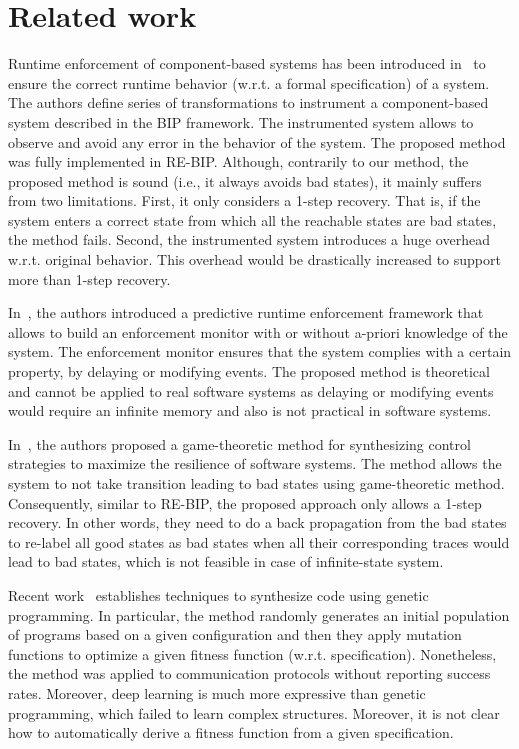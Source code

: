 \section{Related work}
\label{sec:rw}
Runtime enforcement of component-based systems has been introduced in~\cite{CharafeddineEFJ15} to ensure the correct runtime behavior (w.r.t. a formal specification) of a system. 
The authors define series of transformations to instrument a component-based system described in the BIP framework. The instrumented system allows to observe and avoid any error in the behavior of the system. 
The proposed method was fully implemented in RE-BIP. 
Although, contrarily to our method, the proposed method is sound (i.e., it always avoids bad states), it mainly suffers from two limitations. First, it only considers a 1-step recovery. That is, if the system enters a correct state from which all the reachable states are bad states, the method fails.  Second, the instrumented system introduces a huge overhead w.r.t. original behavior. This overhead would be drastically increased to support more than 1-step recovery. 

In~\cite{PinisettyPTJFM16,PinisettyT16}, the authors introduced a predictive runtime enforcement framework that allows to build an enforcement monitor with or without a-priori knowledge of the system. 
The enforcement monitor ensures that the system complies with a certain property, by delaying or modifying events. The proposed method is theoretical and cannot be applied to real software systems as delaying or modifying events would require an infinite memory and also is not practical in software systems. 

In~\cite{HuangPSW16}, the authors proposed a game-theoretic method for synthesizing control strategies to maximize the resilience of software systems. The method allows the system to not take transition leading to bad states using game-theoretic method. Consequently,  similar to RE-BIP, the proposed approach only allows a 1-step recovery. In other words, they need to do a back propagation from the bad states to re-label all good states as bad states when all their corresponding traces would lead to bad states, which is not feasible in case of infinite-state system. 


Recent work~\cite{genetic1,genetic2,genetic3} establishes techniques to synthesize code using genetic programming.  In particular, the method randomly generates an initial population of programs based on a given configuration and then they apply mutation functions to optimize a given fitness function (w.r.t. specification). Nonetheless, the method was applied to communication protocols without reporting success rates. Moreover, deep learning is much more expressive than genetic programming, which failed to learn complex structures. Moreover, it is not clear how to automatically derive a fitness function from a given specification. 
